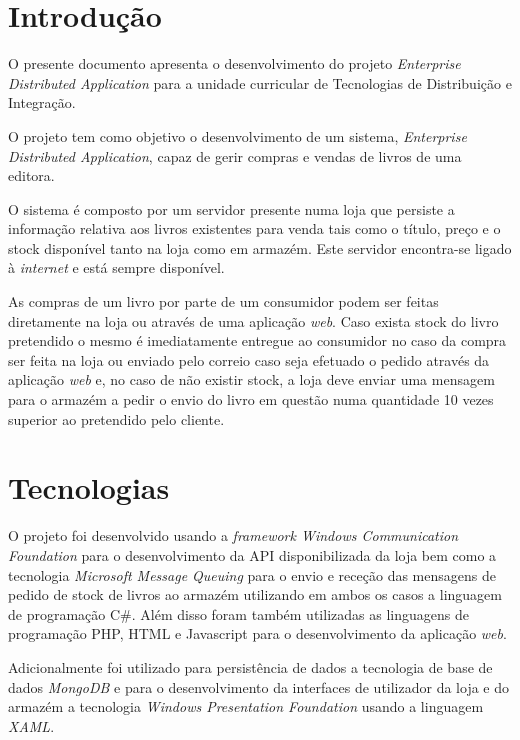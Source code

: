 \documentclass[12pt]{article}
\begin{document}
\newpage

\section{Introdução}

O presente documento apresenta o desenvolvimento do projeto \textit{Enterprise Distributed Application} para a unidade curricular de Tecnologias de Distribuição e Integração. 

O projeto tem como objetivo o desenvolvimento de um sistema, \textit{Enterprise Distributed Application}, capaz de gerir compras e vendas de livros de uma editora. 

O sistema é composto por um servidor presente numa loja que persiste a informação relativa aos livros existentes para venda tais como o título, preço e o stock disponível tanto na loja como em armazém. Este servidor encontra-se ligado à \textit{internet} e está sempre disponível.

As compras de um livro por parte de um consumidor podem ser feitas diretamente na loja ou através de uma aplicação \textit{web}. Caso exista stock do livro pretendido o mesmo é imediatamente entregue ao consumidor no caso da compra ser feita na loja ou enviado pelo correio caso seja efetuado o pedido através da aplicação \textit{web} e, no caso de não existir stock, a loja deve enviar uma mensagem para o armazém a pedir o envio do livro em questão numa quantidade 10 vezes superior ao pretendido pelo cliente.


\section{Tecnologias}

O projeto foi desenvolvido usando a \textit{framework Windows Communication Foundation} para o desenvolvimento da API disponibilizada da loja bem como a tecnologia \textit{Microsoft Message Queuing} para o envio e receção das mensagens de pedido de stock de livros ao armazém utilizando em ambos os casos a linguagem de programação C\#. Além disso foram também utilizadas as linguagens de programação PHP, HTML  e Javascript para o desenvolvimento da aplicação \textit{web}. 

Adicionalmente foi utilizado para persistência de dados a tecnologia de base de dados \textit{MongoDB} e para o desenvolvimento da interfaces de utilizador da loja e do armazém a tecnologia \textit{Windows Presentation Foundation} usando a linguagem \textit{XAML}.
\end{document}
